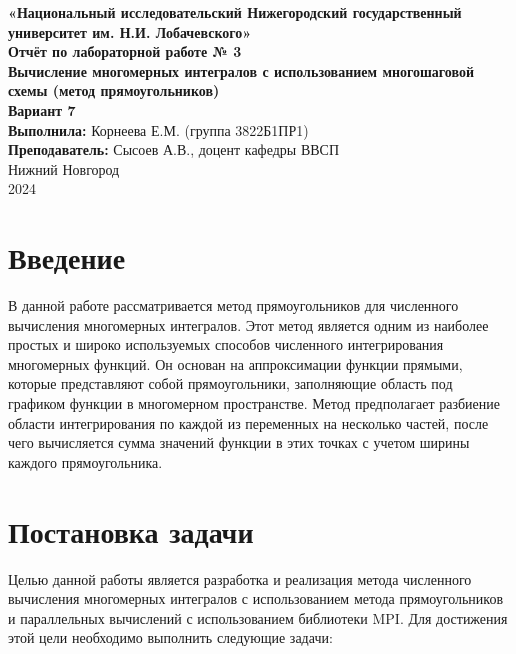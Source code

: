 \documentclass[12pt]{article}
\title{}
\author{}
\date{}
\begin{document}
\begin{titlepage}
\centering
\large
\textbf{«Национальный исследовательский Нижегородский государственный университет им. Н.И. Лобачевского»}\\[6cm]

{\Large \textbf{Отчёт по лабораторной работе № 3}}\\[0.5cm]
{\Large \textbf{Вычисление многомерных интегралов с использованием многошаговой схемы (метод прямоугольников)}}\\[0.5cm]
{\Large \textbf{Вариант 7}}\\[1.5cm]

{ \textbf{Выполнила:} Корнеева Е.М. (группа 3822Б1ПР1)}\\[0.2cm]
{\textbf{Преподаватель:} Сысоев А.В., доцент кафедры ВВСП}\\[9cm]

{\large Нижний Новгород\\ 2024}
\end{titlepage}

\newpage
\section*{Введение}

В данной работе рассматривается метод прямоугольников для численного вычисления многомерных интегралов. Этот метод является одним из наиболее простых и широко используемых способов численного интегрирования многомерных функций. Он основан на аппроксимации функции прямыми, которые представляют собой прямоугольники, заполняющие область под графиком функции в многомерном пространстве. Метод предполагает разбиение области интегрирования по каждой из переменных на несколько частей, после чего вычисляется сумма значений функции в этих точках с учетом ширины каждого прямоугольника.

\section*{Постановка задачи}

Целью данной работы является разработка и реализация метода численного вычисления многомерных интегралов с использованием метода прямоугольников и параллельных вычислений с использованием библиотеки MPI. Для достижения этой цели необходимо выполнить следующие задачи:
\end{document}
